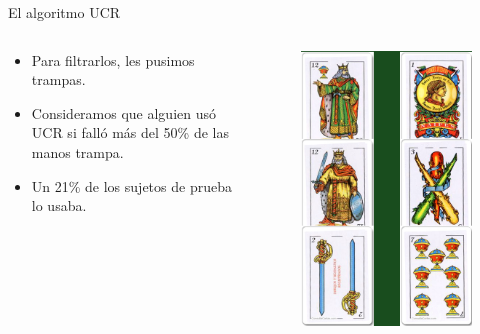 \documentclass{beamer}
\begin{document}
\begin{frame}{El algoritmo UCR}
  \begin{columns}
    \begin{column}{.4\linewidth}
	  	\begin{itemize}
        \item Para filtrarlos, les pusimos trampas.
        \item Consideramos que alguien usó UCR si falló más del 50\% de las manos trampa.
        \item Un 21\% de los sujetos de prueba lo usaba.
        \end{itemize}
    \end{column}
    \begin{column}{.6\linewidth}
     \begin{figure}
        \includegraphics[width=0.75\linewidth]{examples_img/manos_1.png}
     \end{figure}
    \end{column}
  \end{columns}
\end{frame}
\end{document}

